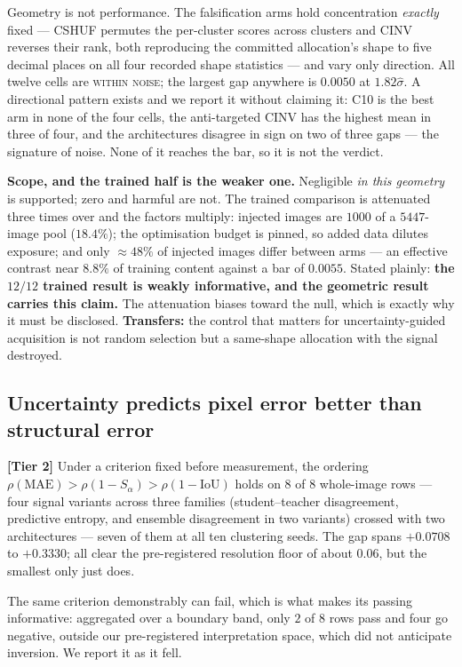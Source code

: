 \documentclass{article} %
\begin{document}
Geometry is not performance. The falsification arms hold concentration \emph{exactly} fixed --- CSHUF
permutes the per-cluster scores across clusters and CINV reverses their rank, both reproducing the
committed allocation's shape to five decimal places on all four recorded shape statistics --- and vary
only direction. All twelve cells are \textsc{within noise}; the largest gap anywhere is $0.0050$ at
$1.82\hat{\sigma}$. A directional pattern exists and we report it without claiming it: C10 is the best
arm in none of the four cells, the anti-targeted CINV has the highest mean in three of four, and the
architectures disagree in sign on two of three gaps --- the signature of noise. None of it reaches the
bar, so it is not the verdict.

\textbf{Scope, and the trained half is the weaker one.} Negligible \emph{in this geometry} is
supported; zero and harmful are not. The trained comparison is attenuated three times over and the
factors multiply: injected images are $1000$ of a $5447$-image pool ($18.4\%$); the optimisation budget
is pinned, so added data dilutes exposure; and only $\approx 48\%$ of injected images differ between
arms --- an effective contrast near $8.8\%$ of training content against a bar of $0.0055$. Stated
plainly: \textbf{the $12/12$ trained result is weakly informative, and the geometric result carries
this claim.} The attenuation biases toward the null, which is exactly why it must be disclosed.
\textbf{Transfers:} the control that matters for uncertainty-guided acquisition is not random
selection but a same-shape allocation with the signal destroyed.

\subsection{Uncertainty predicts pixel error better than structural error}
\label{sec:diss-ordering}

\textbf{[Tier 2]} Under a criterion fixed before measurement, the ordering
$\rho(\mathrm{MAE}) > \rho(1-S_\alpha) > \rho(1-\mathrm{IoU})$ holds on $8$ of $8$ whole-image rows ---
four signal variants across three families (student--teacher disagreement, predictive entropy, and
ensemble disagreement in two variants) crossed with two architectures --- seven of them at all ten
clustering seeds. The gap spans $+0.0708$ to $+0.3330$; all clear the pre-registered resolution floor
of about $0.06$, but the smallest only just does.

The same criterion demonstrably can fail, which is what makes its passing informative: aggregated over
a boundary band, only $2$ of $8$ rows pass and four go negative, outside our pre-registered
interpretation space, which did not anticipate inversion. We report it as it fell.
\end{document}
